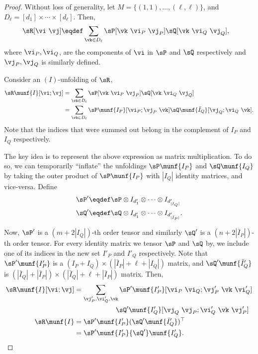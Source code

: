 \begin{proof}
  Without loss of generality, let $M = \{(1,1), \ldots, (\ell,\ell)\}$,
  and $D_\ell = [d_1] \times \cdots \times [d_\ell]$. 
  Then, 
  \begin{align*}
    \sR[\vi\ \vj] &\eqdef \sum_{\vk \in D_\ell} \sP[\vk\ \vi_P\ \vj_P] \sQ[\vk\ \vi_Q\ \vj_Q],
  \end{align*}
  where $\vi_P, \vi_Q$, are the components of $\vi$ in $\sP$ and $\sQ$
  respectively and $\vj_P, \vj_Q$ is similarly defined.

Consider an $(I)$-unfolding of $\sR$,
  \begin{align*}
    \sR\munf{I}[\vi;\vj] 
       &= \sum_{\vk \in D_\ell} \sP[\vk\  \vi_P \  \vj_P] \sQ[\vk\  \vi_Q \  \vj_Q] \\
       &= \sum_{\vk \in D_\ell} \sP\munf{I_P}[\vi_P; \vj_P \  \vk] \sQ\munf{\bar I_Q}[\vj_Q ; \vi_Q \  \vk].
  \end{align*}
Note that the indices that were summed out belong in the complement of
$I_P$ and $I_Q$ respectively.

The key idea is to represent the above expression as matrix multiplication.
To do so, we can temporarily ``inflate'' the unfoldings $\sP\munf{I_P}$
  and $\sQ\munf{I_Q}$ by taking the outer product of $\sP\munf{I_P}$ with
  $|I_Q|$ identity matrices, and vice-versa. Define 
\begin{align*}
  \sP' &\eqdef \sP \otimes I_{d'_1} \otimes \cdots \otimes I_{d'_{|I_Q|}} \\
  \sQ' &\eqdef \sQ \otimes I_{d'_1} \otimes \cdots \otimes I_{d'_{|\bar I_P|}}.
\end{align*}

Now, $\sP'$ is a $(m + 2 |I_Q|)$-th order tensor and similarly $\sQ'$
  is a $(n + 2 |\bar I_P|)$-th order tensor. 
For every identity matrix we tensor $\sP$ and $\sQ$ by, we include one of
  its indices in the new set $I'_P$ and $I'_Q$ respectively.
Note that ${\sP'}\munf{I'_P}$ is a $(I_P + I_Q)\times (|\bar I_P| + \ell
  + |I_Q|)$ matrix, and ${\sQ'}\munf{\bar I'_Q}$ is $(|\bar I_Q| + |\bar
  I_P|) \times (|\bar I_Q| + \ell + |\bar I_P|)$ matrix.
Then,
\begin{align*}
    \sR\munf{I}[\vi;\vj] 
    &= \sum_{\vj'_P, \vi'_Q, \vk}
    {\sP'}\munf{I'_P}[\vi_P \  \vi_Q; \vj'_P \  \vk \  \vi'_Q ]  \\ 
    &\quad \hphantom{\sum_{\be_P, \be_Q, \vk}}
    {\sQ'}\munf{I'_Q}[\vj_Q \  \vj_P; \vi'_Q \  \vk \  \vj'_P ] \\
    \sR\munf{I} &= {\sP'}\munf{I'_P} ({\sQ'}\munf{\bar I'_Q})^\top \\
                &= {\sP'}\munf{I'_P} {\sQ'}\munf{I'_Q}.
\end{align*}


\end{proof}
